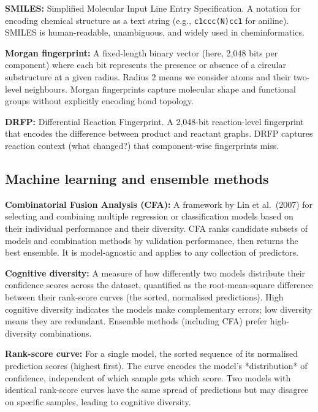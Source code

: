\documentclass[11pt,a4paper]{article}
\begin{document}
\noindent\textbf{SMILES:} Simplified Molecular Input Line Entry Specification.
A notation for encoding chemical structure as a text string (e.g.,
\texttt{c1ccc(N)cc1} for aniline). SMILES is human-readable, unambiguous,
and widely used in cheminformatics.

\noindent\textbf{Morgan fingerprint:} A fixed-length binary vector (here, 2{,}048
bits per component) where each bit represents the presence or absence of a
circular substructure at a given radius. Radius 2 means we consider atoms and
their two-level neighbours. Morgan fingerprints capture molecular shape and
functional groups without explicitly encoding bond topology.

\noindent\textbf{DRFP:} Differential Reaction Fingerprint. A 2{,}048-bit
reaction-level fingerprint that encodes the difference between product and
reactant graphs. DRFP captures reaction context (what changed?) that
component-wise fingerprints miss.

\subsection*{Machine learning and ensemble methods}

\noindent\textbf{Combinatorial Fusion Analysis (CFA):} A framework by Lin
et al.\ (2007) for selecting and combining multiple regression or classification
models based on their individual performance and their diversity. CFA ranks
candidate subsets of models and combination methods by validation performance,
then returns the best ensemble. It is model-agnostic and applies to any
collection of predictors.

\noindent\textbf{Cognitive diversity:} A measure of how differently two models
distribute their confidence scores across the dataset, quantified as the
root-mean-square difference between their rank-score curves (the sorted,
normalised predictions). High cognitive diversity indicates the models make
complementary errors; low diversity means they are redundant. Ensemble methods
(including CFA) prefer high-diversity combinations.

\noindent\textbf{Rank-score curve:} For a single model, the sorted sequence of
its normalised prediction scores (highest first). The curve encodes the model's
*distribution* of confidence, independent of which sample gets which score.
Two models with identical rank-score curves have the same spread of predictions
but may disagree on specific samples, leading to cognitive diversity.
\end{document}
